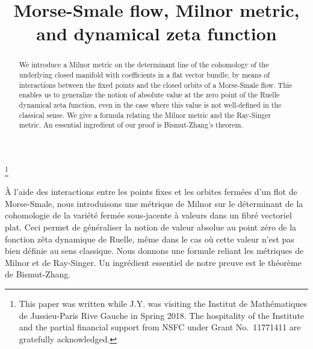 \documentclass[JEP,XML,SOM,Unicode]{cedram}
\theoremstyle{plain}
\theoremstyle{definition}
\theoremstyle{remark}
\begin{document}
\frontmatter
\title{Morse-Smale flow, Milnor metric, and dynamical zeta function}

\author[\initial{S.} \lastname{Shen}]{ }
\address{Institut de Mathématiques de Jussieu-Paris Rive Gauche,
Sorbonne Université\\
4 place Jussieu, 75252 Paris Cedex 05, France}

\author[\initial{J.} \lastname{Yu}]{ }
\address{School of Mathematical Sciences, University of Science and Technology of China\\
96 Jinzhai Road, Hefei, Anhui 230026, P. R. China}
\urladdr{}

\thanks{This paper was written while J.Y. was visiting the Institut de Mathématiques de Jussieu-Paris Rive Gauche in Spring 2018. The hospitality of the Institute and the partial financial support from NSFC under Grant No.~11771411 are gratefully acknowledged.}


\begin{abstract}
We introduce a Milnor metric on the determinant line of the cohomology of the underlying closed manifold with coefficients in a flat vector bundle, by means of interactions between the fixed points and the closed orbits of a Morse-Smale flow. This enables us to generalize the notion of absolute value at the zero point of the Ruelle dynamical zeta function, even in the case where this value is not well-defined in the classical sense. We give a formula relating the Milnor metric and the Ray-Singer metric. An essential ingredient of our proof is Bismut-Zhang's theorem.
\end{abstract}



\begin{altabstract}
À l'aide des interactions entre les points fixes et les orbites fermées d'un flot de Morse-Smale, nous introduisons une métrique de Milnor sur le  déterminant de la cohomologie de la variété fermée sous-jacente à valeurs dans un fibré vectoriel plat. Ceci permet de généraliser la notion de valeur absolue au point zéro de la fonction zêta dynamique de Ruelle, même dans le cas où cette valeur n'est pas bien définie au sens classique. Nous donnons une formule reliant les métriques de Milnor et de Ray-Singer. Un ingrédient essentiel de notre preuve est le théorème de Bismut-Zhang.
\end{altabstract}
\end{document}
